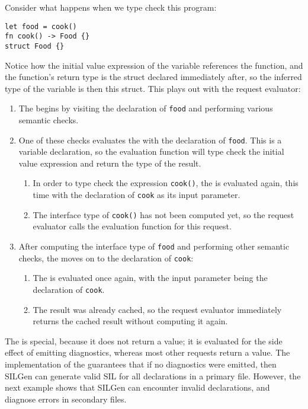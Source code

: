 \documentclass[../generics]{subfiles}
\begin{document}
\begin{example}
Consider what happens when we type check this program:
\begin{Verbatim}
let food = cook()
fn cook() -> Food {}
struct Food {}
\end{Verbatim}
Notice how the initial value expression of the variable references the function, and the function's return type is the struct declared immediately after, so the inferred type of the variable is then this struct. This plays out with the request evaluator:
\begin{enumerate}
\item The  begins by visiting the declaration of \texttt{food} and performing various semantic checks.
\item One of these checks evaluates the  with the declaration of \texttt{food}. This is a variable declaration, so the evaluation function will type check the initial value expression and return the type of the result.
\begin{enumerate}
\item In order to type check the expression \texttt{cook()}, the  is evaluated again, this time with the declaration of \texttt{cook} as its input parameter.
\item The interface type of \texttt{cook()} has not been computed yet, so the request evaluator calls the evaluation function for this request.
\end{enumerate}
\item After computing the interface type of \texttt{food} and performing other semantic checks, the  moves on to the declaration of \texttt{cook}:
\begin{enumerate}
\item The  is evaluated once again, with the input parameter being the declaration of \texttt{cook}.
\item The result was already cached, so the request evaluator immediately returns the cached result without computing it again.
\end{enumerate}
\end{enumerate}
\end{example}

The  is special, because it does not return a value; it is evaluated for the side effect of emitting diagnostics, whereas most other requests return a value. The implementation of the  guarantees that if no diagnostics were emitted, then SILGen can generate valid SIL for all declarations in a primary file. However, the next example shows that SILGen can encounter invalid declarations, and diagnose errors in secondary files.
\end{document}
